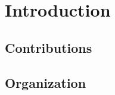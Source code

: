 \chapter{Introduction}
\label{ch:introduction}


\section{Contributions}
\label{sec:intro:contributions}



\section{Organization}
\label{sec:intro:organization}

